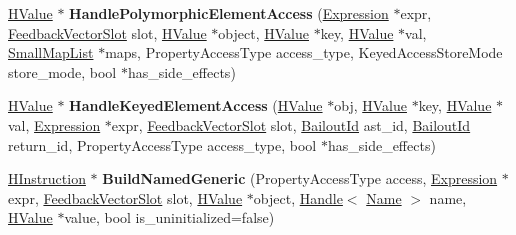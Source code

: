 \begin{DoxyCompactItemize}
\item 
\hyperlink{classv8_1_1internal_1_1_h_value}{H\+Value} $\ast$ {\bfseries Handle\+Polymorphic\+Element\+Access} (\hyperlink{classv8_1_1internal_1_1_expression}{Expression} $\ast$expr, \hyperlink{classv8_1_1internal_1_1_feedback_vector_slot}{Feedback\+Vector\+Slot} slot, \hyperlink{classv8_1_1internal_1_1_h_value}{H\+Value} $\ast$object, \hyperlink{classv8_1_1internal_1_1_h_value}{H\+Value} $\ast$key, \hyperlink{classv8_1_1internal_1_1_h_value}{H\+Value} $\ast$val, \hyperlink{classv8_1_1internal_1_1_small_map_list}{Small\+Map\+List} $\ast$maps, Property\+Access\+Type access\+\_\+type, Keyed\+Access\+Store\+Mode store\+\_\+mode, bool $\ast$has\+\_\+side\+\_\+effects)\hypertarget{classv8_1_1internal_1_1_h_optimized_graph_builder_adf2c34ec28e453a38c8df5ed56a922c3}{}\label{classv8_1_1internal_1_1_h_optimized_graph_builder_adf2c34ec28e453a38c8df5ed56a922c3}

\item 
\hyperlink{classv8_1_1internal_1_1_h_value}{H\+Value} $\ast$ {\bfseries Handle\+Keyed\+Element\+Access} (\hyperlink{classv8_1_1internal_1_1_h_value}{H\+Value} $\ast$obj, \hyperlink{classv8_1_1internal_1_1_h_value}{H\+Value} $\ast$key, \hyperlink{classv8_1_1internal_1_1_h_value}{H\+Value} $\ast$val, \hyperlink{classv8_1_1internal_1_1_expression}{Expression} $\ast$expr, \hyperlink{classv8_1_1internal_1_1_feedback_vector_slot}{Feedback\+Vector\+Slot} slot, \hyperlink{classv8_1_1internal_1_1_bailout_id}{Bailout\+Id} ast\+\_\+id, \hyperlink{classv8_1_1internal_1_1_bailout_id}{Bailout\+Id} return\+\_\+id, Property\+Access\+Type access\+\_\+type, bool $\ast$has\+\_\+side\+\_\+effects)\hypertarget{classv8_1_1internal_1_1_h_optimized_graph_builder_a4c69f7f64772d391970cd9be7a1d6878}{}\label{classv8_1_1internal_1_1_h_optimized_graph_builder_a4c69f7f64772d391970cd9be7a1d6878}

\item 
\hyperlink{classv8_1_1internal_1_1_h_instruction}{H\+Instruction} $\ast$ {\bfseries Build\+Named\+Generic} (Property\+Access\+Type access, \hyperlink{classv8_1_1internal_1_1_expression}{Expression} $\ast$expr, \hyperlink{classv8_1_1internal_1_1_feedback_vector_slot}{Feedback\+Vector\+Slot} slot, \hyperlink{classv8_1_1internal_1_1_h_value}{H\+Value} $\ast$object, \hyperlink{classv8_1_1internal_1_1_handle}{Handle}$<$ \hyperlink{classv8_1_1internal_1_1_name}{Name} $>$ name, \hyperlink{classv8_1_1internal_1_1_h_value}{H\+Value} $\ast$value, bool is\+\_\+uninitialized=false)\hypertarget{classv8_1_1internal_1_1_h_optimized_graph_builder_a03fa30bf0523eda8318465a1bb665de9}{}\label{classv8_1_1internal_1_1_h_optimized_graph_builder_a03fa30bf0523eda8318465a1bb665de9}


\end{DoxyCompactItemize}
